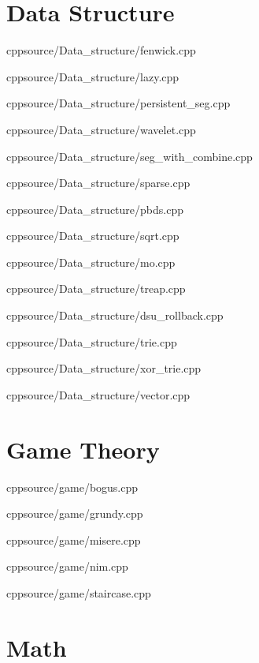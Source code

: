 \documentclass[landscape, 8pt, a4paper, oneside]{extarticle}
\begin{document}
\begin{multicols}{3}
\section{Data Structure}

{}
{}
{cpp}{source/Data_structure/fenwick.cpp}

{}
{}
{cpp}{source/Data_structure/lazy.cpp}

{}
{}
{cpp}{source/Data_structure/persistent_seg.cpp}

{}
{}
{cpp}{source/Data_structure/wavelet.cpp}

{}
{}
{cpp}{source/Data_structure/seg_with_combine.cpp}

{}
{}
{cpp}{source/Data_structure/sparse.cpp}

{}
{}
{cpp}{source/Data_structure/pbds.cpp}

{}
{}
{cpp}{source/Data_structure/sqrt.cpp}

{}
{}
{cpp}{source/Data_structure/mo.cpp}

{}
{}
{cpp}{source/Data_structure/treap.cpp}

{}
{}
{cpp}{source/Data_structure/dsu_rollback.cpp}

{}
{}
{cpp}{source/Data_structure/trie.cpp}

{}
{}
{cpp}{source/Data_structure/xor_trie.cpp}

{}
{}
{cpp}{source/Data_structure/vector.cpp}

\section{Game Theory}

{}
{}
{cpp}{source/game/bogus.cpp}

{}
{}
{cpp}{source/game/grundy.cpp}

{}
{}
{cpp}{source/game/misere.cpp}

{}
{}
{cpp}{source/game/nim.cpp}

{}
{}
{cpp}{source/game/staircase.cpp}

\section{Math}


\end{multicols}
\end{document}
